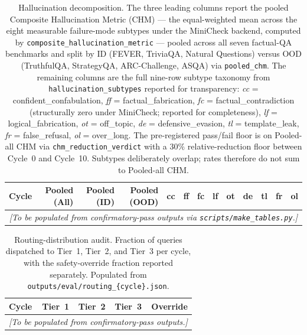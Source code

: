 \begin{table}[t]
\centering
\caption{Hallucination decomposition. The three leading columns report the pooled Composite Hallucination Metric (CHM) --- the equal-weighted mean across the eight measurable failure-mode subtypes under the MiniCheck backend, computed by \texttt{composite\_hallucination\_metric} --- pooled across all seven factual-QA benchmarks and split by ID (FEVER, TriviaQA, Natural Questions) versus OOD (TruthfulQA, StrategyQA, ARC-Challenge, ASQA) via \texttt{pooled\_chm}. The remaining columns are the full nine-row subtype taxonomy from \texttt{hallucination\_subtypes} reported for transparency: \emph{cc} = confident\_confabulation, \emph{ff} = factual\_fabrication, \emph{fc} = factual\_contradiction (structurally zero under MiniCheck; reported for completeness), \emph{lf} = logical\_fabrication, \emph{ot} = off\_topic, \emph{de} = defensive\_evasion, \emph{tl} = template\_leak, \emph{fr} = false\_refusal, \emph{ol} = over\_long. The pre-registered pass/fail floor is on Pooled-all CHM via \texttt{chm\_reduction\_verdict} with a $30\%$ relative-reduction floor between Cycle~0 and Cycle~10. Subtypes deliberately overlap; rates therefore do not sum to Pooled-all CHM.}
\label{tab:halluc}
\scriptsize
\setlength{\tabcolsep}{3pt}
\begin{tabular}{lrrr|rrrrrrrrr}
\toprule
Cycle & Pooled (All) & Pooled (ID) & Pooled (OOD) & cc & ff & fc & lf & ot & de & tl & fr & ol \\
\midrule
\multicolumn{13}{c}{\emph{[To be populated from confirmatory-pass outputs via \texttt{scripts/make\_tables.py}.]}}\\
\bottomrule
\end{tabular}
\end{table}

\begin{table}[t]
\centering
\caption{Routing-distribution audit. Fraction of queries dispatched
to Tier~1, Tier~2, and Tier~3 per cycle, with the safety-override
fraction reported separately. Populated from
\texttt{outputs/eval/routing\_\{cycle\}.json}.}
\label{tab:routing}
\begin{tabular}{lrrrr}
\toprule
Cycle & Tier~1 & Tier~2 & Tier~3 & Override \\
\midrule
\multicolumn{5}{c}{\emph{[To be populated from confirmatory-pass outputs.]}}\\
\bottomrule
\end{tabular}
\end{table}

